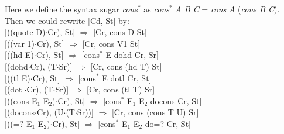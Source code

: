 \documentclass{jfrarticle}
\begin{document}
Here we define the syntax sugar \textit{cons$^{*}$} as \textit{cons$^{*}$} \textit{A B C} = \textit{cons} \textit{A} (\textit{cons B C}). 
Then we could rewrite [Cd, St] by:\\
\indent\hspace{0.5cm}[((quote D)$\cdot$Cr), St]\hspace{1.55cm} $\Rightarrow$ \hspace{0.5cm} [Cr, cons D St]\\
\indent\hspace{0.5cm}[((var 1)$\cdot$Cr), St]\hspace{2.1cm} $\Rightarrow$ \hspace{0.5cm} [Cr, cons V1 St]\\
\indent\hspace{0.5cm}[((hd E)$\cdot$Cr), St]\hspace{2.15cm} $\Rightarrow$ \hspace{0.5cm} [cons$^{*}$ E dohd Cr, Sr]\\
\indent\hspace{0.5cm}[(dohd$\cdot$Cr), (T$\cdot$Sr)]\hspace{1.7cm} $\Rightarrow$ \hspace{0.5cm} [Cr, cons (hd T) St]\\
\indent\hspace{0.5cm}[((tl E)$\cdot$Cr), St]\hspace{2.35cm} $\Rightarrow$ \hspace{0.5cm} [cons$^{*}$ E dotl Cr, St]\\
\indent\hspace{0.5cm}[(dotl$\cdot$Cr), (T$\cdot$Sr)]\hspace{1.9cm} $\Rightarrow$ \hspace{0.5cm} [Cr, cons (tl T) Sr]\\
\indent\hspace{0.5cm}[((cons E$_1$ E$_2$)$\cdot$Cr), St]\hspace{1.1cm} $\Rightarrow$ \hspace{0.5cm} [cons$^{*}$ E$_1$ E$_2$ docons Cr, St]\\
\indent\hspace{0.5cm}[(docons$\cdot$Cr), (U$\cdot$(T$\cdot$Sr))]\hspace{0.7cm} $\Rightarrow$ \hspace{0.5cm} [Cr, cons (cons T U) Sr]\\
\indent\hspace{0.5cm}[((=? E$_1$ E$_2$)$\cdot$Cr), St]\hspace{1.35cm} $\Rightarrow$ \hspace{0.5cm} [cons$^{*}$ E$_1$ E$_2$ do=? Cr, St]\\
\end{document}
